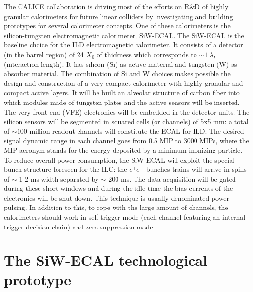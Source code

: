 \documentclass[a4paper,11pt]{article}
\begin{document}
The CALICE collaboration is driving most of the efforts on R\&D of highly granular calorimeters \cite{Sefkow:2015hna} 
for future linear colliders by investigating and building prototypes for several
calorimeter concepts. One of these calorimeters 
is the silicon-tungsten electromagnetic calorimeter, SiW-ECAL.
The SiW-ECAL is the baseline choice for the ILD electromagnetic calorimeter.
It consists of a detector (in the barrel region) of 24 $X_{0}$ of thickness which corresponds to $\sim 1~\lambda_{I}$ (interaction length).
It has silicon (Si) as active material and tungsten (W) as absorber material.
The combination of Si and W choices  makes possible the design and construction
of a very compact calorimeter with highly granular and compact active layers.
It will be built an alveolar structure of carbon fiber into which modules made of tungsten
plates and the active sensors will be inserted. The very-front-end (VFE) electronics will be
embedded in the detector units. The silicon sensors will be segmented
in squared cells (or channels) of 5x5 mm: a total of $\sim 100$ million readout channels will constitute the ECAL for ILD.
The desired signal dynamic range in each channel goes from 0.5 MIP to 3000 MIPs, where the MIP acronym stands 
for the energy deposited by a minimum-inonizing-particle.
To reduce overall power consumption, the SiW-ECAL will exploit the special bunch structure
foreseen for the ILC: the $e^{+}e^{-}$ bunches trains will arrive in spills
of $\sim$ 1-2 ms width separated by $\sim$ 200 ms. The data acquisition will be gated during these short windows and during the idle time the bias currents of the electronics will be shut down.
This technique is usually denominated power pulsing. In addition to this, to cope with the large amount of channels,
the calorimeters should work in self-trigger mode (each channel featuring an internal trigger decision chain) and zero suppression mode. 

\section{The SiW-ECAL technological prototype}
\end{document}
